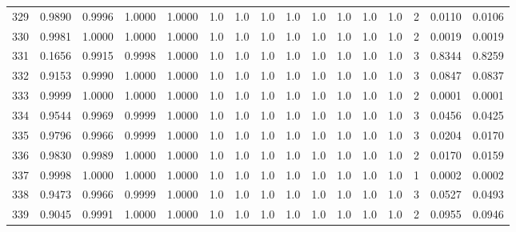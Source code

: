 \begin{tabular}{lrrrrrrrrrrrrrrr}
329 &      0.9890 &  0.9996 &  1.0000 &  1.0000 &     1.0 &     1.0 &     1.0 &     1.0 &     1.0 &     1.0 &      1.0 &        1.0 &      2 &                    0.0110 &                     0.0106 \\
330 &      0.9981 &  1.0000 &  1.0000 &  1.0000 &     1.0 &     1.0 &     1.0 &     1.0 &     1.0 &     1.0 &      1.0 &        1.0 &      2 &                    0.0019 &                     0.0019 \\
331 &      0.1656 &  0.9915 &  0.9998 &  1.0000 &     1.0 &     1.0 &     1.0 &     1.0 &     1.0 &     1.0 &      1.0 &        1.0 &      3 &                    0.8344 &                     0.8259 \\
332 &      0.9153 &  0.9990 &  1.0000 &  1.0000 &     1.0 &     1.0 &     1.0 &     1.0 &     1.0 &     1.0 &      1.0 &        1.0 &      3 &                    0.0847 &                     0.0837 \\
333 &      0.9999 &  1.0000 &  1.0000 &  1.0000 &     1.0 &     1.0 &     1.0 &     1.0 &     1.0 &     1.0 &      1.0 &        1.0 &      2 &                    0.0001 &                     0.0001 \\
334 &      0.9544 &  0.9969 &  0.9999 &  1.0000 &     1.0 &     1.0 &     1.0 &     1.0 &     1.0 &     1.0 &      1.0 &        1.0 &      3 &                    0.0456 &                     0.0425 \\
335 &      0.9796 &  0.9966 &  0.9999 &  1.0000 &     1.0 &     1.0 &     1.0 &     1.0 &     1.0 &     1.0 &      1.0 &        1.0 &      3 &                    0.0204 &                     0.0170 \\
336 &      0.9830 &  0.9989 &  1.0000 &  1.0000 &     1.0 &     1.0 &     1.0 &     1.0 &     1.0 &     1.0 &      1.0 &        1.0 &      2 &                    0.0170 &                     0.0159 \\
337 &      0.9998 &  1.0000 &  1.0000 &  1.0000 &     1.0 &     1.0 &     1.0 &     1.0 &     1.0 &     1.0 &      1.0 &        1.0 &      1 &                    0.0002 &                     0.0002 \\
338 &      0.9473 &  0.9966 &  0.9999 &  1.0000 &     1.0 &     1.0 &     1.0 &     1.0 &     1.0 &     1.0 &      1.0 &        1.0 &      3 &                    0.0527 &                     0.0493 \\
339 &      0.9045 &  0.9991 &  1.0000 &  1.0000 &     1.0 &     1.0 &     1.0 &     1.0 &     1.0 &     1.0 &      1.0 &        1.0 &      2 &                    0.0955 &                     0.0946 \\

\end{tabular}
